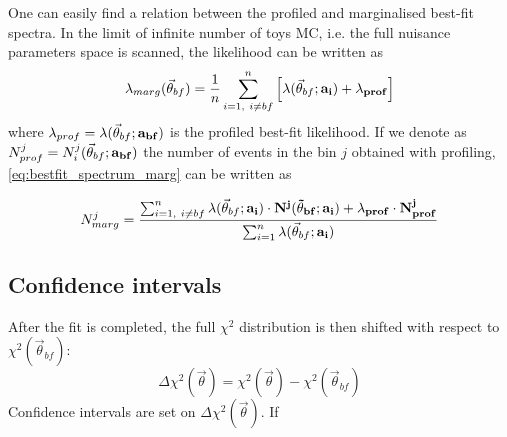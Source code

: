 One can easily find a relation between the profiled and marginalised best-fit spectra.
In the limit of infinite number of toys MC, 
i.e. the full nuisance parameters space is scanned,
the likelihood can be written as
\begin{equation} \label{eq:likemarg_bf}
\lambda_{marg} (\vec{\theta}_{bf}) = \frac{1}{n} \sum_{i=1,~i \neq bf}^{n} \left[ \lambda (\vec{\theta}_{bf}; \bf{a_i}) + \lambda_{prof}  \right]
\end{equation}
where 
$\lambda_{prof} =  \lambda (\vec{\theta}_{bf}; \bf{a_{bf}})$ 
is the profiled best-fit likelihood. 
If we denote as
$N^j_{prof} = N_i^{j}(\vec{\theta}_{bf}; \bf{a_{bf}})$  
the number of events in the bin $j$ obtained with profiling,
\cref{eq:bestfit_spectrum_marg} can be written as

\begin{equation} \label{eq:bestfit_spectrum}
N^j_{marg} = \frac{ \sum_{i=1,~i \neq bf}^{n} \lambda (\vec{\theta}_{bf}; \bf{a_i}) \cdot N^{j}(\vec{\theta}_{bf}; \bf{a_i}) + \lambda_{prof} \cdot N^{j}_{prof}  }{ \sum_{i=1}^{n} \lambda (\vec{\theta}_{bf}; \bf{a_i})  }
\end{equation}







\subsection{Confidence intervals}
\label{sec:cl}

After the fit is completed, 
the full $\chi^2$ distribution is then shifted with respect to $\chi^2 (\vec{\theta}_{bf})$:
\begin{equation} \label{eq:deltachisq}
\Delta \chi^2 (\vec{\theta}) = \chi^2(\vec{\theta}) - \chi^2(\vec{\theta}_{bf})
\end{equation}
Confidence intervals are set on $\Delta \chi^2 (\vec{\theta})$.
If 

